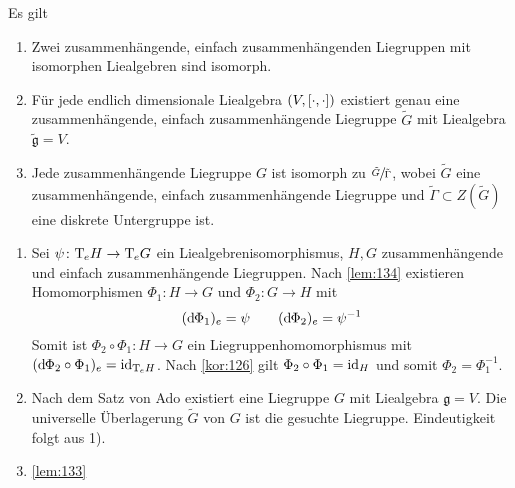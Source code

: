\begin{satz}[{name=[{Liegruppen-Liealgebren-Zusammenhang im einfach zusammenhängenden Fall}]}]
	Es gilt
	\begin{enumerate}[1)]
		\item Zwei zusammenhängende, einfach zusammenhängenden Liegruppen mit isomorphen Liealgebren sind isomorph.
		\item Für jede endlich dimensionale Liealgebra $(V, \benbrace*{\cdot,\cdot })$ existiert genau eine zusammenhängende, einfach zusammenhängende Liegruppe $\tilde{G}$ mit Liealgebra $\tilde{\mathfrak{g}}=V$.
		\item Jede zusammenhängende Liegruppe $G$ ist isomorph zu $\sfrac{\tilde{G}}{\tilde{\Gamma}}$, wobei $\tilde{G}$ eine zusammenhängende, einfach zusammenhängende Liegruppe und $\tilde{\Gamma} \subset Z(\tilde{G})$ eine diskrete Untergruppe ist.
	\end{enumerate}
\end{satz}
\begin{beweis}
	\begin{enumerate}[1)]
		\item Sei $\psi \colon \Tmap_e H \to \Tmap_e G$ ein Liealgebrenisomorphismus, $H,G$ zusammenhängende und einfach zusammenhängende Liegruppen.
		Nach \autoref{lem:134} existieren Homomorphismen $\Phi_1 \colon H \to G$ und $\Phi_2 \colon G \to H$ mit
		\[
			(\mathd \Phi_1)_e = \psi \qquad (\mathd \Phi_2)_e = \psi^{-1}
		\]
		Somit ist $\Phi_2 \circ  \Phi_1 \colon H \to G$ ein Liegruppenhomomorphismus mit $(\mathd \Phi_2 \circ \Phi_1)_e = \id_{\Tmap_e H}$.
		Nach \autoref{kor:126} gilt $\Phi_2 \circ \Phi_1= \id_H$ und somit $\Phi_2 = \Phi_1^{-1}$.
		\item Nach dem Satz von Ado existiert eine Liegruppe $G$ mit Liealgebra $\mathfrak{g}=V$.
		Die universelle Überlagerung $\tilde{G}$ von $G$ ist die gesuchte Liegruppe.
		Eindeutigkeit folgt aus 1).
		\item \autoref{lem:133}\qedhere
	\end{enumerate}
\end{beweis}

